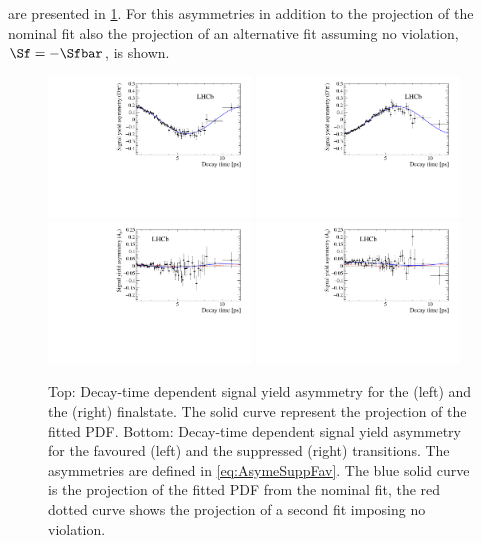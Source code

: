 are presented in \cref{fig:AsymProjection}.
For this asymmetries in addition to the projection of the nominal fit also the projection of an alternative fit assuming no \CP violation, \ie $\Sf=-\Sfbar$, is shown.
\begin{figure}[tbp]
    \centering
    \includegraphics[width=0.48\textwidth]{09TimeFit/figs/Asym_f.pdf}
    \includegraphics[width=0.48\textwidth]{09TimeFit/figs/Asym_fbar.pdf}\\
    \includegraphics[width=0.48\textwidth]{09TimeFit/figs/Asym_favour.pdf}
    \includegraphics[width=0.48\textwidth]{09TimeFit/figs/Asym_suppress.pdf}
    \caption{Top: Decay-time dependent signal yield asymmetry for the \Dm\pip (left) and the \Dp\pim (right) finalstate.
    The solid curve represent the projection of the fitted PDF.
    Bottom: Decay-time dependent signal yield asymmetry for the favoured (left) and the suppressed (right) transitions.
    The asymmetries are defined in \cref{eq:AsymeSuppFav}.
    The blue solid curve is the projection of the fitted PDF from the nominal fit, the red dotted curve shows the projection of a second fit imposing no \CP violation.}
    \label{fig:AsymProjection}
\end{figure}

